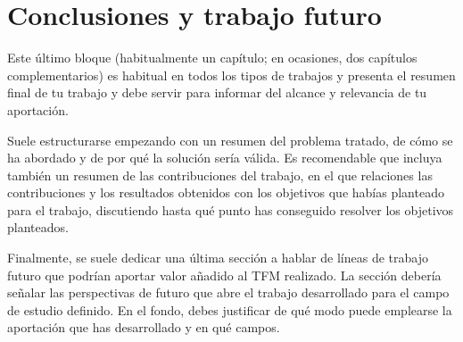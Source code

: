 \chapter{Conclusiones y trabajo futuro}\label{chap:resultados}
Este último bloque (habitualmente un capítulo; en ocasiones, dos capítulos complementarios) es habitual en todos los tipos de trabajos y presenta el resumen final de tu trabajo y debe servir para informar del alcance y relevancia de tu aportación.\par

Suele estructurarse empezando con un resumen del problema tratado, de cómo se ha abordado y de por qué la solución sería válida.
Es recomendable que incluya también un resumen de las contribuciones del trabajo, en el que relaciones las contribuciones y los resultados obtenidos con los objetivos que habías planteado para el trabajo, discutiendo hasta qué punto has conseguido resolver los objetivos planteados.\par

Finalmente, se suele dedicar una última sección a hablar de líneas de trabajo futuro que podrían aportar valor añadido al TFM realizado. La sección debería señalar las perspectivas de futuro que abre el trabajo desarrollado para el campo de estudio definido. En el fondo, debes justificar de qué modo puede emplearse la aportación que has desarrollado y en qué campos.


